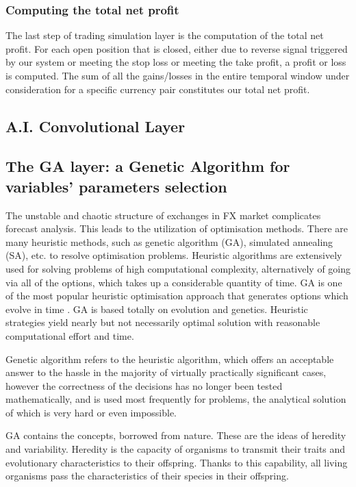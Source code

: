 \subsubsection{Computing the total net profit}
The last step of trading simulation layer is the computation of the total net profit.  
For each open position that is closed, either due to reverse signal triggered by our system or meeting the stop loss or meeting the take profit, a profit or loss is computed. The sum of all the gains/losses in the entire temporal window under consideration for a specific currency pair constitutes our total net profit.


\subsection{A.I. Convolutional Layer}

\subsection{The GA layer: a Genetic Algorithm for variables' parameters selection}
\label{subsection:ga}
The unstable and chaotic structure of exchanges in FX market complicates forecast analysis. This leads to the utilization of optimisation methods. There are many heuristic methods, such as genetic algorithm (GA), simulated annealing (SA), etc. to resolve optimisation problems. Heuristic algorithms are extensively used for solving problems of high computational complexity, alternatively of going via all of the options, which takes up a considerable quantity of time. GA is one of the most popular heuristic optimisation approach that generates options which evolve in time \cite{OZTURK2016170}. GA is based totally on evolution and genetics. Heuristic strategies yield nearly but not necessarily optimal solution with reasonable computational effort and time.

Genetic algorithm refers to the heuristic algorithm, which offers an acceptable answer to the hassle in the majority of virtually practically significant cases, however the correctness of the decisions has no longer been tested mathematically, and is used most frequently for problems, the analytical solution of which is very hard or even impossible.

GA contains the concepts, borrowed from nature. These are the ideas of heredity and variability. Heredity is the capacity of organisms to transmit their traits and evolutionary characteristics to their offspring. Thanks to this capability, all living organisms pass the characteristics of their species in their offspring.

